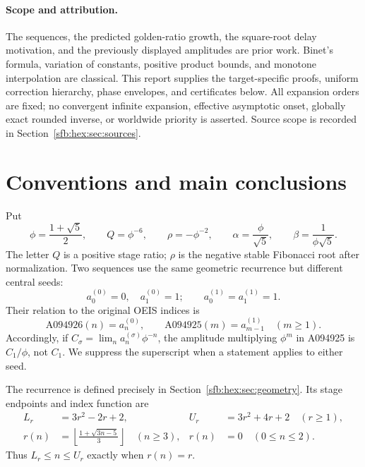\documentclass[11pt]{article}
\theoremstyle{remark}\newtheorem{remark}[theorem]{Remark}
\begin{document}
\paragraph{Scope and attribution.}
The sequences, the predicted golden-ratio growth, the square-root delay motivation, and the previously displayed amplitudes are prior work. Binet's formula, variation of constants, positive product bounds, and monotone interpolation are classical. This report supplies the target-specific proofs, uniform correction hierarchy, phase envelopes, and certificates below. All expansion orders are fixed; no convergent infinite expansion, effective asymptotic onset, globally exact rounded inverse, or worldwide priority is asserted. Source scope is recorded in Section~\ref{sfb:hex:sec:sources}.

\section{Conventions and main conclusions}\label{sfb:hex:sec:main}
Put
\begin{equation}\label{sfb:hex:eq:constants}
 \phi=\frac{1+\sqrt5}{2},\qquad Q=\phi^{-6},\qquad
 \rho=-\phi^{-2},\qquad \alpha=\frac\phi{\sqrt5},\qquad
 \beta=\frac1{\phi\sqrt5}.
\end{equation}
The letter $Q$ is a positive stage ratio; $\rho$ is the negative stable Fibonacci root after normalization. Two sequences use the same geometric recurrence but different central seeds:
\begin{equation}\label{sfb:hex:eq:seeds}
 a^{(0)}_0=0,\quad a^{(0)}_1=1;\qquad
 a^{(1)}_0=a^{(1)}_1=1.
\end{equation}
Their relation to the original OEIS indices is
\begin{equation}\label{sfb:hex:eq:oeisindex}
 \mathrm{A094926}(n)=a^{(0)}_n,\qquad
 \mathrm{A094925}(m)=a^{(1)}_{m-1}\quad(m\ge1).
\end{equation}
Accordingly, if $C_\sigma=\lim_n a^{(\sigma)}_n\phi^{-n}$, the amplitude multiplying $\phi^m$ in A094925 is $C_1/\phi$, not $C_1$. We suppress the superscript when a statement applies to either seed.

The recurrence is defined precisely in Section~\ref{sfb:hex:sec:geometry}. Its stage endpoints and index function are
\begin{align}
 L_r&=3r^2-2r+2,& U_r&=3r^2+4r+2\quad(r\ge1),\label{sfb:hex:eq:stages}\\
 r(n)&=\left\lfloor\frac{1+\sqrt{3n-5}}3\right\rfloor\quad(n\ge3),&
 r(n)&=0\quad(0\le n\le2).\label{sfb:hex:eq:r}
\end{align}
Thus $L_r\le n\le U_r$ exactly when $r(n)=r$.
\end{document}
